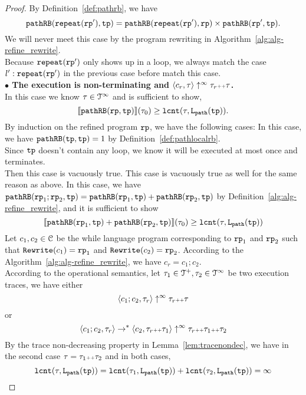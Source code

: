 \begin{proof}
By Definition~\ref{def:pathrb}, we have
\[
  \mathtt{pathRB}(\mathtt{repeat}(\mathtt{rp}'), \mathtt{tp}) = \mathtt{pathRB}(\mathtt{repeat}(\mathtt{rp}'), \mathtt{rp}) \times \mathtt{pathRB}(\mathtt{rp}', \mathtt{tp}).
\]
We will never meet this case by the program rewriting in Algorithm~\ref{alg:alg-refine_rewrite}.
\\
Because $\mathtt{repeat}(\mathtt{rp}')$ only shows up in a loop, we always match the case $l' : \mathtt{repeat}(\mathtt{rp}')$ in the previous case before match this case.
%
\\
\textbf{$\bullet$ The execution is non-terminating and {$\langle {c_r}, \mathtt{\tau} \rangle \uparrow^{\infty} \mathtt{\tau}_r {\scriptscriptstyle ++} \mathtt{\tau}$}.} 
\\
 In this case we know $\mathtt{\tau} \in \mathcal{T}^{\infty}$ and is sufficient to show,
\[
  \llbracket \mathtt{pathRB}(\mathtt{rp}, \mathtt{tp}) \rrbracket(\mathtt{\tau}_0) \geq \mathtt{lcnt}(\mathtt{\tau}, \mathtt{L}_{\mathtt{path}}(\mathtt{tp})).
\]
By induction on the refined program $\mathtt{rp}$,
we have the following cases:
\caseL{$\rprog = \tpath$}
In this case, we have $\mathtt{pathRB}(\mathtt{tp}, \mathtt{tp}) = 1$ by Definition~\ref{def:pathlocalrb}. 
\\
Since $\mathtt{tp}$ doesn't contain any loop, we know it will be executed at most once and terminates.
\\
Then this case is vacuously true.
This case is vacuously true as well for the same reason as above.
In this case, we have $\mathtt{pathRB}(\mathtt{rp}_1;\mathtt{rp}_2, \mathtt{tp}) = \mathtt{pathRB}(\mathtt{rp}_1, \mathtt{tp}) + \mathtt{pathRB}(\mathtt{rp}_2, \mathtt{tp}) $ by Definition~\ref{alg:alg-refine_rewrite}, and
it is sufficient to show
\[
  \llbracket \mathtt{pathRB}(\mathtt{rp}_1, \mathtt{tp}) + \mathtt{pathRB}(\mathtt{rp}_2, \mathtt{tp}) \rrbracket(\mathtt{\tau}_0) \geq \mathtt{lcnt}(\mathtt{\tau}, \mathtt{L}_{\mathtt{path}}(\mathtt{tp})) 
\]
Let $c_1, c_2 \in \mathcal{C}$ be the while language program corresponding to $\mathtt{rp}_1$ and $\mathtt{rp}_2$ such that $\mathtt{Rewrite}(c_1) = \mathtt{rp}_1$ and $\mathtt{Rewrite}(c_2) = \mathtt{rp}_2$.
According to the Algorithm~\ref{alg:alg-refine_rewrite}, we have $c_r = c_1; c_2$.
\\
According to the operational semantics, let $\mathtt{\tau}_1 \in \mathcal{T}^{+}, \mathtt{\tau}_2 \in \mathcal{T}^{\infty}$ be two execution traces, we have either
\[
  \langle c_1; c_2, \mathtt{\tau}_r \rangle \uparrow^{\infty} \mathtt{\tau}_r {\scriptscriptstyle ++} \mathtt{\tau}
\]
or
\[
  \langle c_1; c_2, \mathtt{\tau}_r \rangle \to^* \langle c_2, \mathtt{\tau}_r {\scriptscriptstyle ++} \mathtt{\tau}_1 \rangle \uparrow^{\infty} \mathtt{\tau}_r {\scriptscriptstyle ++} \mathtt{\tau}_1 {\scriptscriptstyle ++} \mathtt{\tau}_2
\]
By the trace non-decreasing property in Lemma~\ref{lem:tracenondec}, we have in the second case $\mathtt{\tau} = \mathtt{\tau}_1 {\scriptscriptstyle ++} \mathtt{\tau}_2$ and in both cases,
\[
  \mathtt{lcnt}(\mathtt{\tau}, \mathtt{L}_{\mathtt{path}}(\mathtt{tp}))  = \mathtt{lcnt}(\mathtt{\tau}_1,  \mathtt{L}_{\mathtt{path}}(\mathtt{tp}))  + \mathtt{lcnt}(\mathtt{\tau}_2,  \mathtt{L}_{\mathtt{path}}(\mathtt{tp})) = \infty 
\]
\end{proof}

